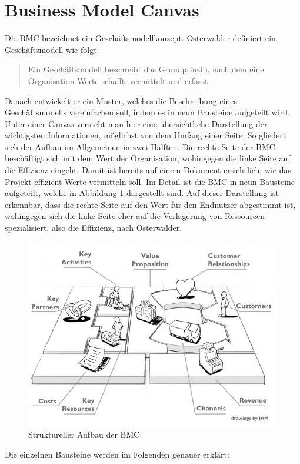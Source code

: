\section{Business Model Canvas}
\label{BMC_Kapitel}
Die \ac{BMC} bezeichnet ein Geschäftsmodellkonzept. Osterwalder definiert ein Geschäftsmodell wie folgt:
\begin{quote}
Ein Geschäftsmodell beschreibt das Grundprinzip, nach dem eine Organisation Werte schafft, vermittelt und erfasst.
\end{quote}
Danach entwickelt er ein Muster, welches die Beschreibung eines Geschäftsmodells vereinfachen soll, indem es in neun Bausteine aufgeteilt wird. Unter einer Canvas versteht man hier eine übersichtliche Darstellung der wichtigsten Informationen, möglichst von dem Umfang einer Seite. So gliedert sich der Aufbau im Allgemeinen in zwei Hälften. Die rechte Seite der \ac{BMC} beschäftigt sich mit dem Wert der Organisation, wohingegen die linke Seite auf die Effizienz eingeht. Damit ist bereits auf einem Dokument ersichtlich, wie das Projekt effizient Werte vermitteln soll. Im Detail ist die \ac{BMC} in neun Bausteine aufgeteilt, welche in Abbildung \ref{BMC_Structure} dargestellt sind. Auf dieser Darstellung ist erkennbar, dass die rechte Seite auf den Wert für den Endnutzer abgestimmt ist, wohingegen sich die linke Seite eher auf die Verlagerung von Ressourcen spezialisiert, also die Effizienz, nach Osterwalder. 
\begin{figure}
	\begin{center}
		\includegraphics[width=\textwidth/2]{99_IMG/02_Grundlagen/bmcStructure.jpg}
		\caption[Struktureller Aufbau der \ac{BMC}]{Struktureller Aufbau der \ac{BMC}\cite{Sammer2018}}
		\label{BMC_Structure}
	\end{center}
\end{figure}
Die einzelnen Bausteine werden im Folgenden genauer erklärt:

